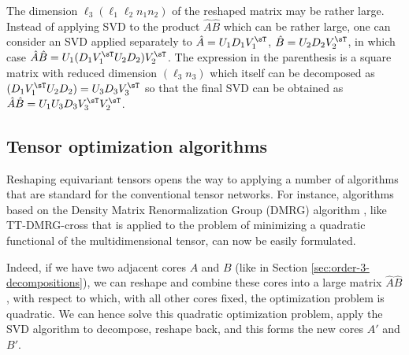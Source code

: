 \begin{remark}
The dimension $\ell_3 (\ell_1 \ell_2 n_1 n_2)$ of the reshaped matrix may be rather large.
Instead of applying SVD to the product $\hat{A} \hat{B}$ which can be rather large, one can consider an SVD applied separately to $\hat{A} = U_1 D_1 V_1^\sT$, $\hat{B} = U_2 D_2 V_2^\sT$, in which case $\hat{A} \hat{B} = U_1 (D_1 V_1^\sT U_2 D_2) V_2^\sT$.
The expression in the parenthesis is a square matrix with reduced dimension $(\ell_3 n_3)$ which itself can be decomposed as $(D_1 V_1^\sT U_2 D_2) = U_3 D_3 V_3^\sT$ so that the final SVD can be obtained as $\hat{A} \hat{B} = U_1 U_3 D_3 V_3^\sT V_2^\sT$.
\end{remark}

\subsection{Tensor optimization algorithms}

Reshaping equivariant tensors opens the way to applying a number of algorithms that are standard for the conventional tensor networks.
For instance, algorithms based on the Density Matrix Renormalization Group (DMRG) algorithm \citep{white_density_1992,perez-garcia_matrix_2007}, like TT-DMRG-cross \citep{savostyanov_fast_2011} that is applied to the problem of minimizing a quadratic functional of the multidimensional tensor, can now be easily formulated.

Indeed, if we have two adjacent cores $A$ and $B$ (like in Section \ref{sec:order-3-decompositions}), we can reshape and combine these cores into a large matrix $\hat{A} \hat{B}$, with respect to which, with all other cores fixed, the optimization problem is quadratic.
We can hence solve this quadratic optimization problem, apply the SVD algorithm to decompose, reshape back, and this forms the new cores $A'$ and $B'$.


